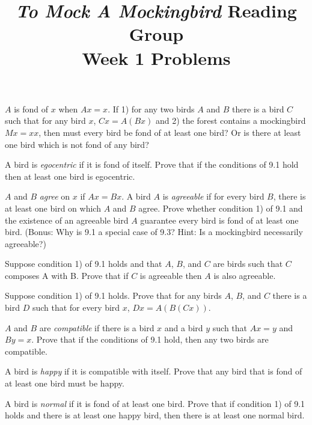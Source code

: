 \documentclass[12pt, letterpaper]{article}
\title{\emph{To Mock A Mockingbird} Reading Group\\Week 1 Problems}
\begin{document}
\maketitle

\disclaimer

\begin{prob}{9.1}
$A$ is fond of $x$ when $Ax = x$. If 1) for any two birds $A$ and $B$ there is a bird $C$ such that for any bird $x$, $Cx = A(Bx)$ and 2) the forest contains a mockingbird $Mx = xx$, then must every bird be fond of at least one bird? Or is there at least one bird which is not fond of any bird?
\end{prob}

\begin{prob}{9.2}
A bird is \emph{egocentric} if it is fond of itself. Prove that if the conditions of 9.1 hold then at least one bird is egocentric.
\end{prob}

\begin{prob}{9.3}
$A$ and $B$ \emph{agree} on $x$ if $Ax = Bx$. A bird $A$ is \emph{agreeable} if for every bird $B$, there is at least one bird on which $A$ and $B$ agree. Prove whether condition 1) of 9.1 and the existence of an agreeable bird $A$ guarantee every bird is fond of at least one bird. (Bonus: Why is 9.1 a special case of 9.3? Hint: Is a mockingbird necessarily agreeable?)
\end{prob}

\begin{prob}{9.4}
Suppose condition 1) of 9.1 holds and that $A$, $B$, and $C$ are birds such that $C$ composes A with B. Prove that if $C$ is agreeable then $A$ is also agreeable.
\end{prob}

\begin{prob}{9.5}
Suppose condition 1) of 9.1 holds. Prove that for any birds $A$, $B$, and $C$ there is a bird $D$ such that for every bird $x$, $Dx = A(B(Cx))$.
\end{prob}

\begin{prob}{9.6}
$A$ and $B$ are \emph{compatible} if there is a bird $x$ and a bird $y$ such that $Ax = y$ and $By = x$. Prove that if the conditions of 9.1 hold, then any two birds are compatible.
\end{prob}

\begin{prob}{9.7}
A bird is \emph{happy} if it is compatible with itself. Prove that any bird that is fond of at least one bird must be happy.
\end{prob}

\begin{prob}{9.8}
A bird is \emph{normal} if it is fond of at least one bird. Prove that if condition 1) of 9.1 holds and there is at least one happy bird, then there is at least one normal bird.
\end{prob}
\end{document}

